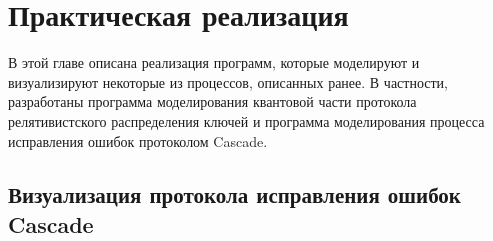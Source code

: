 \chapter{Практическая реализация}
В этой главе описана реализация программ, которые моделируют и визуализируют некоторые из процессов, описанных ранее. В частности, разработаны программа моделирования квантовой части протокола релятивистского распределения ключей и программа моделирования процесса исправления ошибок протоколом Cascade.




\section{Визуализация протокола исправления ошибок Cascade}